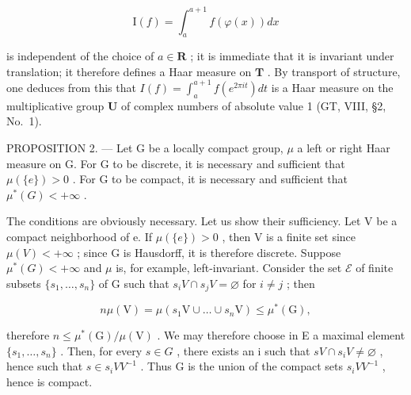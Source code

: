 \[
\mathrm{I} (f) = \int_ {a} ^ {a + 1} f (\varphi (x)) d x
\]

is independent of the choice of \(a \in \mathbf{R}\) ; it is immediate that it is invariant under translation; it therefore defines a Haar measure on \(\mathbf{T}\) . By transport of structure, one deduces from this that \(I(f) = \int_{a}^{a + 1} f(e^{2\pi it}) dt\) is a Haar measure on the multiplicative group \(\mathbf{U}\) of complex numbers of absolute value 1 (GT, VIII, §2, No.~1).

PROPOSITION 2. --- Let G be a locally compact group, \(\mu\) a left or right Haar measure on G. For G to be discrete, it is necessary and sufficient that \(\mu(\{e\}) > 0\) . For G to be compact, it is necessary and sufficient that \(\mu^{*}(G) < +\infty\) .

The conditions are obviously necessary. Let us show their sufficiency. Let V be a compact neighborhood of e. If \(\mu(\{e\}) > 0\) , then V is a finite set since \(\mu(V) < +\infty\) ; since G is Hausdorff, it is therefore discrete. Suppose \(\mu^{*}(G)<+\infty\) and \(\mu\) is, for example, left-invariant. Consider the set \(\mathscr{E}\) of finite subsets \(\{s_{1},\ldots,s_{n}\}\) of G such that \(s_{i}V\cap s_{j}V=\varnothing\) for \(i\neq j\) ; then

\[
n \mu (\mathrm{V}) = \mu (s _ {1} \mathrm{V} \cup \dots \cup s _ {n} \mathrm{V}) \leqslant \mu^ {*} (\mathrm{G}),
\]

therefore \(n \leqslant \mu^{*}(\mathrm{G})/\mu(\mathrm{V})\) . We may therefore choose in E a maximal element \(\{s_{1},\ldots,s_{n}\}\) . Then, for every \(s \in G\) , there exists an i such that \(sV \cap s_{i}V \neq \varnothing\) , hence such that \(s \in s_{i}VV^{-1}\) . Thus G is the union of the compact sets \(s_{i}VV^{-1}\) , hence is compact.

